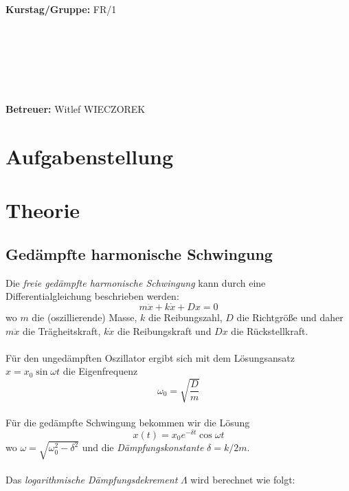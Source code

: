 \documentclass{article}
\begin{document}
\begin{verbatim}


\end{verbatim}
			\begin{flushleft}
			\textbf{\Large{Kurstag/Gruppe:}} \Large{FR/1}
			\end{flushleft}

\begin{verbatim}






\end{verbatim}
			\begin{flushleft}
			\LARGE{\textbf{Betreuer:}}	\Large{Witlef WIECZOREK}	
			\end{flushleft}
			
\newpage

\section{Aufgabenstellung}
\section{Theorie}

\subsection{Gedämpfte harmonische Schwingung}

Die \textit{freie gedämpfte harmonische Schwingung} kann durch eine Differentialgleichung beschrieben werden:
\begin{equation}
\label{diffharmonisch}
m\ddot{x}+k\dot{x}+Dx=0
\end{equation}
wo $m$ die (oszillierende) Masse, $k$ die Reibungszahl, $D$ die Richtgröße und daher $m\ddot{x}$ die Trägheitskraft, $k\dot{x}$ die Reibungskraft und $Dx$ die Rückstellkraft.\\
\\
Für den ungedämpften Oszillator ergibt sich mit dem Lösungsansatz $x=x_0\sin \omega t$ die Eigenfrequenz
\begin{equation}
\label{eigenfrequenz}
\omega_0=\sqrt{\frac{D}{m}}
\end{equation}
\\
Für die gedämpfte Schwingung bekommen wir die Lösung
\begin{equation}
\label{gedaempft}
x(t)=x_0 e^{-\delta t}\cos \omega t
\end{equation}
wo $\omega=\sqrt{\omega^2_0 - \delta^2}$ und die \textit{Dämpfungskonstante} $\delta=k/2m$.\\
\\
Das \textit{logarithmische Dämpfungsdekrement} $\Lambda$ wird berechnet wie folgt:
\end{document}
